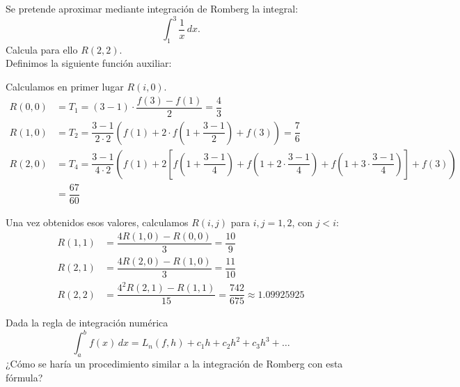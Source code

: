 \documentclass[12pt]{article}
\author{Arturo Olivares Martos}
\date{\today}
\begin{document}
    {\color{blue}

    \renewcommand{\headrulewidth}{1pt}
    \renewcommand{\headrule}{\hbox to\headwidth{%
    \color{blue}\leaders\hrule height \headrulewidth\hfill}}
    
    \begin{ejercicio}
        Se pretende aproximar mediante integración de Romberg la integral:
        \begin{equation*}
            \int_1^3 \frac{1}{x} \, dx.
        \end{equation*}
        Calcula para ello \( R(2, 2) \).\\

        Definimos la siguiente función auxiliar:

        Calculamos en primer lugar \( R(i, 0) \).
        \begin{align*}
            R(0, 0) &= T_1 = (3-1)\cdot \dfrac{f(3)-f(1)}{2}
            = \dfrac{4}{3}\\
            R(1, 0) &= T_2 = \dfrac{3-1}{2\cdot 2}\left(f(1)+2\cdot f\left(1+\dfrac{3-1}{2}\right)+f(3)\right)
            = \dfrac{7}{6}\\
            R(2, 0) &= T_{4} = \dfrac{3-1}{4\cdot 2}\left(f(1)+2\left[f\left(1+\dfrac{3-1}{4}\right)+f\left(1+2\cdot \dfrac{3-1}{4}\right)+f\left(1+3\cdot \dfrac{3-1}{4}\right)\right]+f(3)\right)
            \\&= \dfrac{67}{60}
        \end{align*}

        Una vez obtenidos esos valores, calculamos \( R(i, j) \) para \( i,j=1,2 \), con $ j < i $:
        \begin{align*}
            R(1, 1) &= \dfrac{4R(1,0)-R(0,0)}{3} = \dfrac{10}{9}\\
            R(2, 1) &= \dfrac{4R(2,0)-R(1,0)}{3} = \dfrac{11}{10}\\
            R(2, 2) &= \dfrac{4^2R(2,1)-R(1,1)}{15} = \dfrac{742}{675}\approx 1.09925925
        \end{align*}
    \end{ejercicio}

    \begin{ejercicio}
        Dada la regla de integración numérica
        \begin{equation*}
            \int_a^b f(x) \, dx = L_n(f, h) + c_1 h + c_2 h^2 + c_3 h^3 + \ldots
        \end{equation*}
        ¿Cómo se haría un procedimiento similar a la integración de Romberg con esta fórmula?
    \end{ejercicio}
    }
\end{document}
